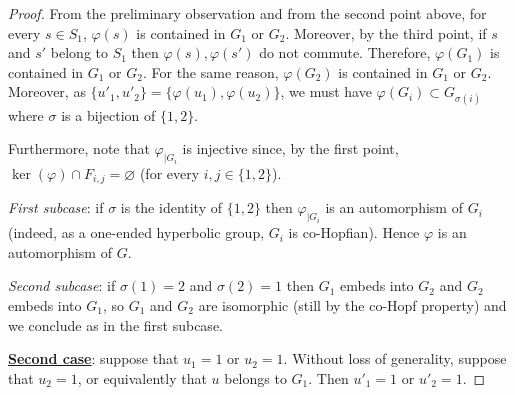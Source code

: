 \documentclass[a4paper, 11pt]{amsart}
\theoremstyle{definition}
\theoremstyle{remark}
\begin{document}
\begin{proof}
\smallskip \noindent
From the preliminary observation and from the second point above, for every $s\in S_1$, $\varphi(s)$ is contained in $G_1$ or $G_2$. Moreover, by the third point, if $s$ and $s'$ belong to $S_1$ then $\varphi(s),\varphi(s')$ do not commute. Therefore, $\varphi(G_1)$ is contained in $G_1$ or $G_2$. For the same reason, $\varphi(G_2)$ is contained in $G_1$ or $G_2$.
Moreover, as $\lbrace u'_1,u'_2\rbrace=\lbrace \varphi(u_1),\varphi(u_2)\rbrace$, we must have $\varphi(G_i)\subset G_{\sigma(i)}$ where $\sigma$ is a bijection of $\lbrace 1,2\rbrace$.

\smallskip \noindent
Furthermore, note that $\varphi_{\vert G_i}$ is injective since, by the first point, $\ker(\varphi)\cap F_{i,j}=\varnothing$ (for every $i,j\in\lbrace 1,2\rbrace$). 

\smallskip \noindent
\emph{First subcase}: if $\sigma$ is the identity of $ \lbrace 1,2\rbrace$ then $\varphi_{\vert G_i}$ is an automorphism of $G_i$ (indeed, as a one-ended hyperbolic group, $G_i$ is co-Hopfian). Hence $\varphi$ is an automorphism of $G$.

\smallskip \noindent
\emph{Second subcase}: if $\sigma(1)=2$ and $\sigma(2)=1$ then $G_1$ embeds into $G_2$ and $G_2$ embeds into $G_1$, so $G_1$ and $G_2$ are isomorphic (still by the co-Hopf property) and we conclude as in the first subcase.


\smallskip \noindent
\underline{\textbf{Second case}}: suppose that $u_1=1$ or $u_2=1$. Without loss of generality, suppose that $u_2=1$, or equivalently that $u$ belongs to $G_1$. Then $u'_1=1$ or $u'_2=1$. 


\end{proof}
\end{document}
